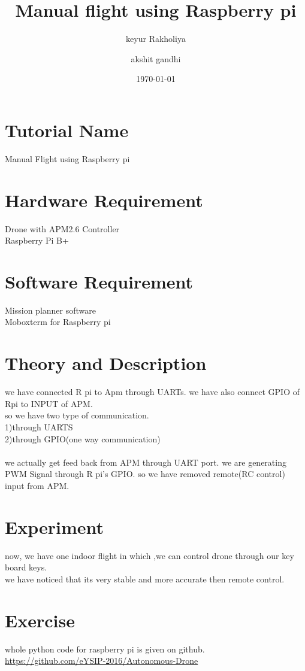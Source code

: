 \documentclass[11pt,a4paper]{article}
\title{Manual flight using Raspberry pi}
\author{keyur Rakholiya}
\author{akshit gandhi}
\date{\today}
\begin{document}
	\maketitle
	\newpage
	\tableofcontents
	\newpage
	\section{Tutorial Name}
		Manual Flight using Raspberry pi

	\section{Hardware Requirement}
		Drone with APM2.6 Controller\\
		Raspberry Pi B+

	\section{Software Requirement}
		Mission planner software\\
		Moboxterm for Raspberry pi
	\section{Theory and Description}
		we have connected R pi to Apm through UARTs. we have also connect GPIO of Rpi to INPUT of APM.\\
		so we have two type of communication.\\
		1)through UARTS\\
		2)through GPIO(one way communication)\\
		\\
		we actually get feed back from APM through UART port. we are generating PWM Signal through R pi's GPIO.
		so we have removed remote(RC control) input from APM.
	\section{Experiment}
		now, we have one indoor flight in which ,we can control drone through our key board keys.\\
		we have noticed that its very stable and more accurate then remote control.
	\section{Exercise}
		whole python code for raspberry pi is given on github.\\
		\url{https://github.com/eYSIP-2016/Autonomous-Drone}

	
\end{document}
